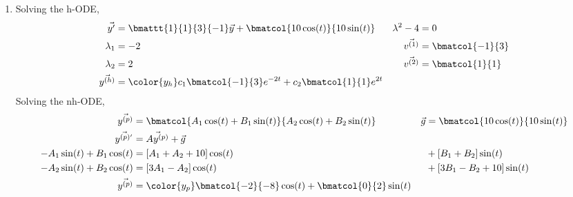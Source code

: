 \begin{enumerate}
    \item Solving the h-ODE,
          \begin{align}
              \vec{y'}                         & = \bmattt{1}{1}{3}{-1} \vec{y}
              + \bmatcol{10\cos(t)}{10\sin(t)} &
              \lambda^{2} - 4                  & = 0                              \\
              \lambda_1                        & = -2                           &
              \vec{v^{(1)}}                    & = \bmatcol{-1}{3}                \\
              \lambda_2                        & = 2                            &
              \vec{v^{(2)}}                    & = \bmatcol{1}{1}                 \\
              \vec{y^{(h)}}                    & = \color{y_h}
              c_1 \bmatcol{-1}{3}e^{-2t} + c_2 \bmatcol{1}{1} e^{2t}
          \end{align}
          Solving the nh-ODE,
          \begin{align}
              \vec{y^{(p)}}             & = \bmatcol{A_1\cos(t) + B_1\sin(t)}
              {A_2\cos(t) + B_2\sin(t)} &
              \vec{g}                   & = \bmatcol{10 \cos(t)}{10 \sin(t)}    \\
              \vec{y^{(p)'}}            & = \vec{Ay^{(p)}} + \vec{g}            \\
              -A_1\sin(t) + B_1\cos(t)  & = [A_1 + A_2 + 10]\cos(t)           &
                                        & + [B_1 + B_2]\sin(t)                  \\
              -A_2\sin(t) + B_2\cos(t)  & = [3A_1 - A_2]\cos(t)               &
                                        & + [3B_1 - B_2 + 10]\sin(t)            \\
              \vec{y^{(p)}}             & = \color{y_p} \bmatcol
              {-2}{-8}\cos(t) + \bmatcol{0}{2}\sin(t)
          \end{align}


\end{enumerate}
